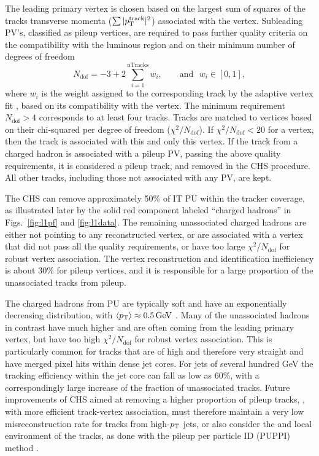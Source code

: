 \documentclass[11pt,twoside,a4paper,cmspaper,final,collab]{cms-tdr}
\begin{document}
The leading primary vertex is chosen based on the largest sum of squares of the tracks transverse momenta ($\sum \vert p_{\mathrm{T}}^\mathrm{track}\vert^2$) associated with the vertex. Subleading PV's, classified as pileup vertices, are required to pass further quality criteria on the compatibility with the luminous region and on their minimum number of degrees of freedom
\begin{equation}
N_\mathrm{dof}=-3+2\sum_{i=1}^\mathrm{nTracks}w_i, \qquad \mathrm{and} \ \ \ w_i\in[0,1],
\end{equation}
where $w_i$ is the weight assigned to the corresponding track by the adaptive vertex fit \cite{Chatrchyan:2014fea}, based on its compatibility with the vertex.
The minimum requirement $N_\mathrm{dof}>4$ corresponds to at least four tracks. Tracks are matched to vertices based on their chi-squared per degree of freedom ($\chi^2/N_\mathrm{dof}$). If $\chi^2/N_\mathrm{dof}<20$ for a vertex, then the track is associated with this and only this vertex. If the track from a charged hadron is associated with a  pileup PV, passing the above quality requirements, it is considered a pileup track, and removed in the CHS procedure. All other tracks, including those not associated with any PV, are kept.

The CHS can remove approximately 50\% of IT PU within the tracker coverage, as illustrated later by the solid red component labeled ``charged hadrons'' in Figs.~\ref{fig:l1pf} and \ref{fig:l1data}. The remaining unassociated charged hadrons are either not pointing to any reconstructed vertex, or are associated with a vertex that did not pass all the quality requirements, or have too large $\chi^2/N_\mathrm{dof}$ for robust vertex association.
The vertex reconstruction and identification inefficiency is about 30\% for pileup vertices, and it is responsible for a large proportion of the unassociated tracks from pileup.

The charged hadrons from PU are typically soft and have an exponentially decreasing \pt distribution, with $\langle p_{\mathrm{T}} \rangle \approx 0.5\,\text{Ge\hspace{-.08em}V}$ \cite{dNdeta}.
Many of the unassociated hadrons in contrast have much higher \pt and are often coming from the leading primary vertex, but have too high $\chi^2/N_\mathrm{dof}$ for robust vertex association. This is particularly common for tracks that are of high \pt and therefore very straight and have merged pixel hits within dense jet cores. For jets of several hundred GeV the tracking efficiency within the jet core can fall as low as 60\%, with a correspondingly large increase of the fraction of unassociated tracks.
Future improvements of CHS aimed at removing a higher proportion of pileup tracks, \eg, with more efficient track-vertex association, must therefore maintain a very low misreconstruction rate for tracks from high-$p_{\mathrm{T}}$ jets, or also consider the \pt and local environment of the tracks, as done with the pileup per particle ID ({PUPPI}) method \cite{puppi}.
\end{document}
